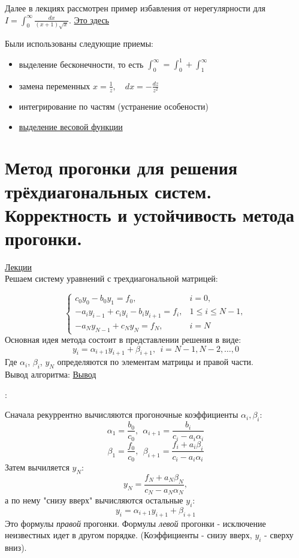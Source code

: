 \documentclass[specialist, subf, href, colorlinks=true, 12pt, times, mtpro, final]{disser}
\theoremstyle{definition}
\begin{document}
    Далее в лекциях рассмотрен пример избавления от нерегулярности для $I = \int_0^{\infty} \frac{dx}{(x+1)\sqrt{x}}$. \hyperlink {lects.45}{Это здесь}
    
    Были использованы следующие приемы:
    \begin{itemize}
        \item выделение бесконечности, то есть $\int_0^{\infty} = \int_0^1 + \int_1^{\infty}$
        \item замена переменных $x = \frac{1}{z}, \quad dx = -\frac{dz}{z^2}$
        \item интегрирование по частям (устранение особености)
        \item \hyperlink {lects.46}{выделение весовой функции}
        
    \end{itemize}
    
\section {Метод прогонки для решения трёхдиагональных систем. Корректность и устойчивость метода прогонки.}
    \hyperlink {lects.48}{Лекции}\\
    Решаем систему уравнений с трехдиагональной матрицей:
    
    \begin{equation*}
     \begin{cases}
       c_0 y_0 - b_0 y_1 = f_0, &i = 0,\\
       -a_i y_{i-1} + c_i y_i - b_i y_{i+1} = f_i, &1 \le i \le N-1, \\
       -a_N y_{N-1} + c_N y_N = f_N, & i = N
     \end{cases}
    \end{equation*}
    Основная идея метода состоит в представлении решения в виде:
    $$y_i = \alpha_{i+1} y_{i+1} + \beta_{i+1}, \ \ i = N-1, N-2, \dots , 0$$
    Где $\alpha_i$, $\beta_i$, $y_N$ определяются по элементам матрицы и правой части.\\
    Вывод алгоритма: \hyperlink {lects.48}{Вывод}
    
    :
    
    Сначала рекуррентно вычисляются прогоночные коэффициенты $\alpha_i, \beta_i$:
    $$
       \alpha_1 = \frac{b_0}{c_0}, \ \ \alpha_{i+1} = \frac{b_i}{c_i - a_i \alpha_i}
    $$
    $$
       \beta_1 = \frac{f_0}{c_0}, \ \ \beta_{i+1} = \frac{f_i + a_i \beta_i}{c_i - a_i \alpha_i}
    $$
    Затем вычиляется $y_N$:
    $$
       y_N = \frac{f_N + a_N \beta_N}{c_N - a_N \alpha_N},
    $$
    а по нему "снизу вверх"{} вычисляются остальные $y_i$:
    $$
       y_i = \alpha_{i+1} y_{i+1} + \beta_{i+1}
    $$
    Это формулы \emph{правой} прогонки. Формулы \emph{левой} прогонки - исключение неизвестных идет в другом порядке. (Коэффициенты - снизу вверх, $y_i$ - сверху вниз).
\end{document}

